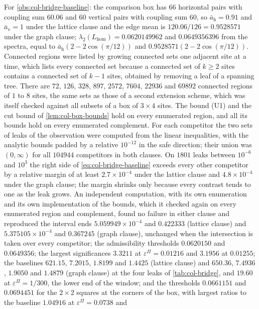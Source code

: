 
\begin{numcheck}\label{chk:col-bridge-baseline}
For \cref{obs:col-bridge-baseline}: the comparison box has $66$ horizontal pairs with coupling sum $60.06$ and $60$ vertical pairs with coupling sum $60$, so $\bar a_{\mathrm h}=0.91$ and $\bar a_{\mathrm v}=1$ under the lattice clause and the edge mean is $120.06/126=0.9528571$ under the graph clause; $\lambda_2(L_{\mathrm{hom}})=0.0620149962$ and $0.0649356396$ from the spectra, equal to $\bar a_{\mathrm h}(2-2\cos(\pi/12))$ and $0.9528571(2-2\cos(\pi/12))$. Connected regions were listed by growing connected sets one adjacent site at a time, which lists every connected set because a connected set of $k\ge2$ sites contains a connected set of $k-1$ sites, obtained by removing a leaf of a spanning tree. There are $72$, $126$, $328$, $897$, $2572$, $7604$, $22936$ and $69892$ connected regions of $1$ to $8$ sites, the same sets as those of a second extension scheme, which was itself checked against all subsets of a box of $3\times4$ sites. The bound (U1) and the cut bound of \cref{lem:col-box-bounds} hold on every enumerated region, and all its bounds hold on every enumerated complement. For each competitor the two sets of leaks of the observation were computed from the linear inequalities, with the analytic bounds padded by a relative $10^{-12}$ in the safe direction; their union was $(0,\infty)$ for all $104944$ competitors in both clauses. On $1801$ leaks between $10^{-6}$ and $10^3$ the right side of \eqref{eq:col-bridge-baseline} exceeds every other competitor by a relative margin of at least $2.7\times10^{-4}$ under the lattice clause and $4.8\times10^{-4}$ under the graph clause; the margin shrinks only because every contrast tends to one as the leak grows. An independent computation, with its own enumeration and its own implementation of the bounds, which it checked again on every enumerated region and complement, found no failure in either clause and reproduced the interval ends $5.059949\times10^{-4}$ and $0.422333$ (lattice clause) and $5.375105\times10^{-4}$ and $0.367245$ (graph clause), unchanged when the intersection is taken over every competitor; the admissibility thresholds $0.0620150$ and $0.0649356$; the largest significances $3.3211$ at $\varepsilon^\Pi=0.01216$ and $3.1956$ at $0.01255$; the baselines $621.15$, $7.2015$, $1.8199$ and $1.4425$ (lattice clause) and $650.36$, $7.4936$, $1.9050$ and $1.4879$ (graph clause) at the four leaks of \cref{tab:col-bridge}, and $19.60$ at $\varepsilon^\Pi=1/300$, the lower end of the window; and the thresholds $0.0661151$ and $0.0694451$ for the $2\times2$ squares at the corners of the box, with largest ratios to the baseline $1.04916$ at $\varepsilon^\Pi=0.0738$ and 
\end{numcheck}
